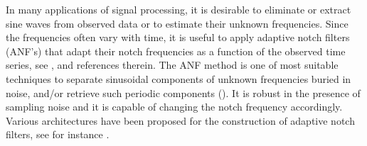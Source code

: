 \documentclass{UCF_ETD}
\begin{document}
 In many applications of signal processing, it is desirable to eliminate or extract sine waves from observed data or to estimate their unknown frequencies. Since the frequencies often vary with time, it is useful to apply adaptive notch filters (ANF's) that adapt their notch frequencies as a function of the observed time series,  %
 see  \cite{Nehorai1994}, \cite{Marina1995} and references therein. The ANF method is
one of most suitable techniques to separate sinusoidal components of unknown frequencies  buried in noise, and/or retrieve such periodic components  (\cite{ hsuortegadamm99,  marino02, xia02, mojiri04, hou05, mojiri07, mojiri07b}).
   It is robust in the presence of sampling noise and it  is capable of changing the notch frequency accordingly.
   Various architectures   have been proposed for the construction of adaptive notch filters, see
   for instance
   \cite{ regalia91, regalia95, debrunner00, limzouzheng05, cousseau07, tanjiang09, regalia10}.
\end{document}
